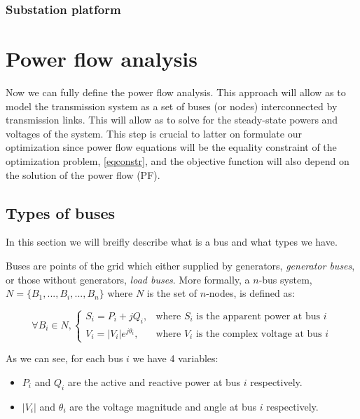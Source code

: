\documentclass[a4paper,11pt, titlepage, twoside]{article}
\begin{document}
\subsubsection{Substation platform}

\newpage

\section{Power flow analysis} \label{fulltransmission}

Now we can fully define the power flow analysis.  This approach will allow as to model the transmission system as a set of buses (or nodes)
interconnected by transmission links. This will allow as to solve for the steady-state powers and voltages of the system. This step is crucial to latter on
formulate our optimization since power flow equations will be the equality constraint of the optimization problem, \ref{eqconstr}, and the objective function will also depend on the solution of the power flow (PF).

\subsection{Types of buses}

In this section we will breifly describe what is a bus and what types we have.\par
Buses are points of the grid which either supplied by generators, \textit{generator buses}, or those without generators, \textit{load buses}. More formally, a $n$-bus system, $N=\{B_1,...,B_i,...,B_n\}$ where $N$ is the set of $n$-nodes, is defined as:

\begin{equation}
    \forall B_i \in N,
    \begin{cases}
        S_i = P_i + jQ_i, & \text{where } S_i \text{ is the apparent power at bus } i \\
        V_i = |V_i|e^{j\theta_i}, & \text{where } V_i \text{ is the complex voltage at bus } i
    \end{cases}
\end{equation}

As we can see, for each bus $i$ we have 4 variables:

\begin{itemize}
    \item $P_i$ and $Q_i$ are the active and reactive power at bus $i$ respectively.
    \item $|V_i|$ and $\theta_i$ are the voltage magnitude and angle at bus $i$ respectively.
\end{itemize}
\end{document}
